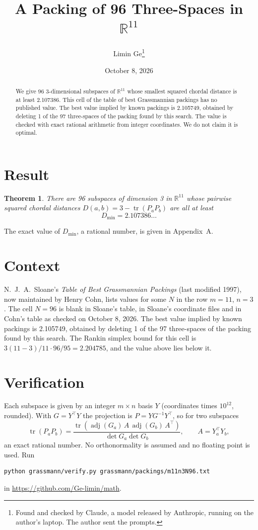 \documentclass[11pt,a4paper]{article}
\title{A Packing of 96 Three-Spaces in $\mathbb{R}^{11}$}
\author{Limin Ge\thanks{Found and checked by Claude, a model released by Anthropic, running on the author's laptop. The author sent the prompts.}}
\date{October 8, 2026}
\newtheorem*{theorem}{Theorem}
\begin{document}
\maketitle
\begin{abstract}
We give 96 3-dimensional subspaces of $\mathbb{R}^{11}$ whose smallest squared chordal distance is at least 2.107386. This cell of the table of best Grassmannian packings has no published value. The best value implied by known packings is 2.105749, obtained by deleting 1 of the 97 three-spaces of the packing found by this search. The value is checked with exact rational arithmetic from integer coordinates. We do not claim it is optimal.
\end{abstract}

\section{Result}
\begin{theorem}
There are 96 subspaces of dimension 3 in $\mathbb{R}^{11}$ whose pairwise squared chordal distances $D(a,b) = 3 - \operatorname{tr}(P_aP_b)$ are all at least
\[ D_{\min} = 2.107386\ldots \]
\end{theorem}
The exact value of $D_{\min}$, a rational number, is given in Appendix~A.


\section{Context}
N.~J.~A.~Sloane's \emph{Table of Best Grassmannian Packings} (last modified 1997), now maintained by Henry Cohn, lists values for some $N$ in the row $m=11$, $n=3$. The cell $N=96$ is blank in Sloane's table, in Sloane's coordinate files and in Cohn's table as checked on October 8, 2026. The best value implied by known packings is 2.105749, obtained by deleting 1 of the 97 three-spaces of the packing found by this search. The Rankin simplex bound for this cell is $3(11-3)/11\cdot 96/95 = 2.204785$, and the value above lies below it.


\section{Verification}
Each subspace is given by an integer $m\times n$ basis $Y$ (coordinates times $10^{12}$, rounded). With $G=Y^\top Y$ the projection is $P=YG^{-1}Y^\top$, so for two subspaces
\[ \operatorname{tr}(P_aP_b)=\frac{\operatorname{tr}(\operatorname{adj}(G_a)\,A\,\operatorname{adj}(G_b)\,A^\top)}{\det G_a\det G_b},\qquad A=Y_a^\top Y_b, \]
an exact rational number. No orthonormality is assumed and no floating point is used. Run
\begin{verbatim}
python grassmann/verify.py grassmann/packings/m11n3N96.txt
\end{verbatim}
in \url{https://github.com/Ge-limin/math}.
\end{document}
